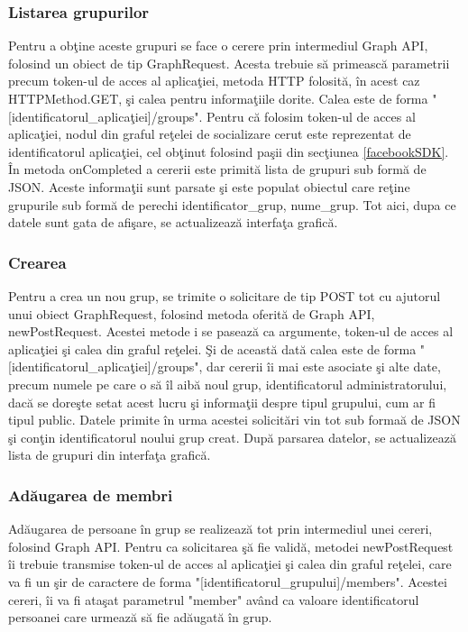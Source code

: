 \subsubsection{Listarea grupurilor}
Pentru a ob\c{t}ine aceste grupuri se face o cerere prin intermediul Graph API, folosind un obiect de tip GraphRequest. Acesta trebuie s\u{a} primeasc\u{a} parametrii precum token-ul de acces al aplica\c{t}iei, metoda HTTP folosit\u{a}, \^{i}n acest caz HTTPMethod.GET, \c{s}i calea pentru informa\c{t}iile dorite. Calea este de forma "[identificatorul_aplica\c{t}iei]/groups". Pentru c\u{a} folosim token-ul de acces al aplica\c{t}iei, nodul din graful re\c{t}elei de socializare cerut este reprezentat de identificatorul aplica\c{t}iei, cel ob\c{t}inut folosind pa\c{s}ii din sec\c{t}iunea \ref{facebookSDK}. \^{I}n metoda onCompleted a cererii este primit\u{a} lista de grupuri sub form\u{a} de JSON. Aceste informa\c{t}ii sunt parsate \c{s}i este populat obiectul care re\c{t}ine grupurile sub form\u{a} de perechi identificator_grup, nume_grup. Tot aici, dupa ce datele sunt gata de afi\c{s}are, se actualizeaz\u{a} interfa\c{t}a grafic\u{a}.

\subsubsection{Crearea}

Pentru a crea un nou grup, se trimite o solicitare de tip POST tot cu ajutorul unui obiect GraphRequest, folosind metoda oferit\u{a} de Graph API, newPostRequest. Acestei metode i se paseaz\u{a} ca argumente, token-ul de acces al aplica\c{t}iei \c{s}i calea din graful re\c{t}elei. \c{S}i de aceast\u{a} dat\u{a} calea este de forma "[identificatorul_aplica\c{t}iei]/groups", dar cererii \^{i}i mai este asociate \c{s}i alte date, precum numele pe care o s\u{a} \^{i}l aib\u{a} noul grup, identificatorul administratorului, dac\u{a} se dore\c{s}te setat acest lucru \c{s}i informa\c{t}ii despre tipul grupului, cum ar fi tipul public. Datele primite \^{i}n urma acestei solicit\u{a}ri vin tot sub forma\u{a} de JSON \c{s}i con\c{t}in identificatorul noului grup creat. Dup\u{a} parsarea datelor, se actualizeaz\u{a} lista de grupuri din interfa\c{t}a grafic\u{a}.

\subsubsection{Ad\u{a}ugarea de membri}

Ad\u{a}ugarea de persoane \^{i}n grup se realizeaz\u{a} tot prin intermediul unei cereri, folosind Graph API. Pentru ca solicitarea \c{s}\u{a} fie valid\u{a}, metodei newPostRequest \^{i}i trebuie transmise token-ul de acces al aplica\c{t}iei \c{s}i calea din graful re\c{t}elei, care va fi un \c{s}ir de caractere de forma "[identificatorul_grupului]/members". Acestei  cereri, \^{i}i va fi ata\c{s}at parametrul "member" av\^{a}nd ca valoare identificatorul persoanei care urmeaz\u{a} s\u{a} fie ad\u{a}ugat\u{a} \^{i}n grup.

